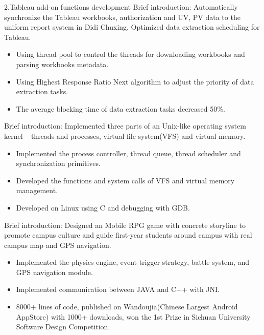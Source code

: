 \documentclass{resume}
\begin{document}
2.Tableau add-on functions development
Brief introduction: Automatically synchronize the Tableau workbooks, authorization and UV, PV data to the uniform report system in Didi Chuxing. Optimized data extraction scheduling for Tableau.
\begin{itemize}
  \item Using thread pool to control the threads for downloading workbooks and parsing workbooks metadata.
  \item Using Highest Response Ratio Next algorithm to adjust the priority of data extraction tasks.
  \item The average blocking time of data extraction tasks decreased 50\%.
\end{itemize}


Brief introduction: Implemented three parts of an Unix-like operating system kernel – threads and processes, virtual file system(VFS) and virtual memory.
\begin{itemize}
  \item Implemented the process controller, thread queue, thread scheduler and synchronization primitives.
  \item Developed the functions and system calls of VFS and virtual memory management.
  \item Developed on Linux using C and debugging with GDB.
\end{itemize}

Brief introduction: Designed an Mobile RPG game with concrete storyline to promote campus culture and guide first-year students around campus with real campus map and GPS navigation.
\begin{itemize}
  \item Implemented the physics engine, event trigger strategy, battle system, and GPS navigation module.
  \item Implemented communication between JAVA and C++ with JNI.
  \item 8000+ lines of code, published on Wandoujia(Chinese Largest Android AppStore) with 1000+ downloads, won the 1st Prize in Sichuan University Software Design Competition.
\end{itemize}
\end{document}
